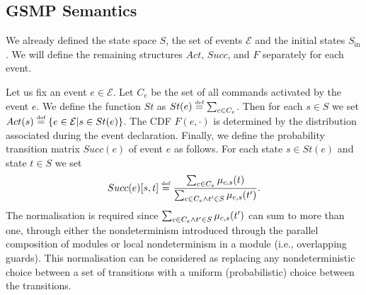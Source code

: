 \documentclass{article}
\newcommand{\eqdef}{\ensuremath{\stackrel{\text{\tiny def}}{=}}}
\newcommand{\calE}{\mathcal{E}}
\renewcommand{\_}{\underline{~}}
\newcommand{\events}{{\calE}}
\newcommand{\suc}{Succ}
\newcommand{\initstates}{S_\mathrm{in}}
\newcommand{\act}{Act}
\begin{document}
\subsection*{
	GSMP Semantics}
We already defined the state space $S$, the set of events $\events$ and the initial states $\initstates$. 
We will define the remaining structures $\act$, $\suc$, and $F$ separately for each event.

Let us fix an event $e \in \events$. 
Let $C_e$ be the set of all commands activated by the event $e$.
We define the function $St$ as $St(e) \eqdef \sum_{c \in C_e}$.
Then for each $s \in S$ we set $\act(s) \eqdef \{e \in \events | s \in St(e) \}$.
The CDF $F(e,\cdot)$ is determined by the distribution associated during the event declaration. 
Finally, we define the probability transition matrix  $\suc(e)$ of event $e$ as follows. 
For each state $s\in St(e)$ and state $t \in S$ we set
\[\suc(e)[s,t] \eqdef \frac{\sum_{c \in C_e} \mu_{c,s}(t)}{\sum_{c \in C_e \\ \wedge t'\in S} \mu_{c,s}(t')}. \]
%
%
The normalisation is required since $\sum_{c \in C_e \\ \wedge t'\in S} \mu_{c,s}(t')$ can sum to more than one, through either the nondeterminism introduced through the parallel composition of modules or local nondeterminism in a module (i.e., overlapping guards). 
This normalisation can be considered as replacing any nondeterministic choice between a set of transitions with a uniform (probabilistic) choice between the transitions.
\end{document}
